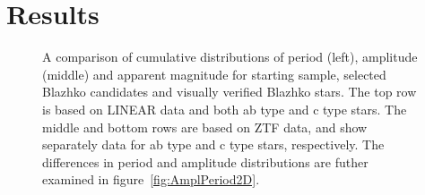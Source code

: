 

\section{Results}\label{sec:results}

\begin{figure}[ht]
  \centering
 \caption{A comparison of cumulative distributions of period (left),
 amplitude (middle) and apparent magnitude for starting sample,
 selected Blazhko candidates and visually verified Blazhko
 stars. The top row is based on LINEAR data and both ab type and c
 type stars. The middle and bottom rows are
 based on ZTF data, and show separately data for ab type and c type
 stars, respectively. The differences in period and amplitude
 distributions are futher examined in figure~\ref{fig:AmplPeriod2D}.}
    \label{fig:AmplPeriod}
\end{figure}


